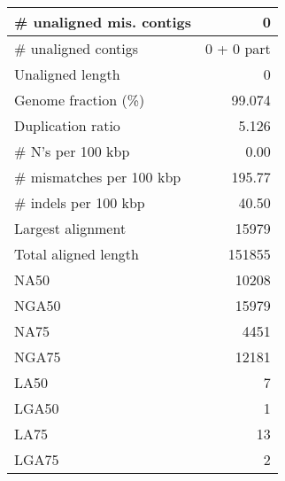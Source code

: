 \documentclass[12pt,a4paper]{article}
\begin{document}
\begin{table}[ht]
\begin{center}
\begin{tabular}{|l*{1}{|r}|}
\# unaligned mis. contigs & 0 \\ \hline
\# unaligned contigs & 0 + 0 part \\ \hline
Unaligned length & 0 \\ \hline
Genome fraction (\%) & 99.074 \\ \hline
Duplication ratio & 5.126 \\ \hline
\# N's per 100 kbp & 0.00 \\ \hline
\# mismatches per 100 kbp & 195.77 \\ \hline
\# indels per 100 kbp & 40.50 \\ \hline
Largest alignment & 15979 \\ \hline
Total aligned length & 151855 \\ \hline
NA50 & 10208 \\ \hline
NGA50 & 15979 \\ \hline
NA75 & 4451 \\ \hline
NGA75 & 12181 \\ \hline
LA50 & 7 \\ \hline
LGA50 & 1 \\ \hline
LA75 & 13 \\ \hline
LGA75 & 2 \\ \hline
\end{tabular}
\end{center}
\end{table}
\end{document}
